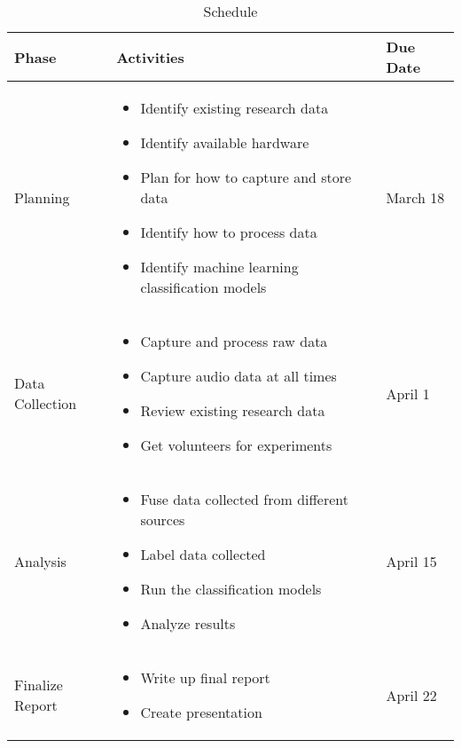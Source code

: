 \documentclass[conference]{IEEEtran}
\begin{document}
	\begin{table}[htbp]
		\caption{Schedule}
		\begin{center}
			\begin{tabular}{| m{1.2cm} | m{4cm} | m{1.2cm} |}
				\hline
				\textbf{Phase} & \textbf{Activities} & \textbf{Due Date} \\
				\hline
				Planning & 
				\begin{itemize}
					\item Identify existing research data
					\item Identify available hardware
					\item Plan for how to capture and store data
					\item Identify how to process data
					\item Identify machine learning classification models
				\end{itemize} &
				March 18 \\
				\hline
				
				Data Collection & 
				\begin{itemize}
					\item Capture and process raw data
					\item Capture audio data at all times
					\item Review existing research data
					\item Get volunteers for experiments
				\end{itemize} & 
				April 1 \\
				\hline
				
				Analysis & 
				\begin{itemize}
					\item Fuse data collected from different sources
					\item Label data collected
					\item Run the classification models
					\item Analyze results
				\end{itemize} & 
				April 15 \\
				\hline
				
				Finalize Report & 
				\begin{itemize}
					\item Write up final report
					\item Create presentation
				\end{itemize} & 
				April 22 \\
				\hline
			\end{tabular}
			\label{tab1}
		\end{center}
	\end{table}
	
\end{document}
